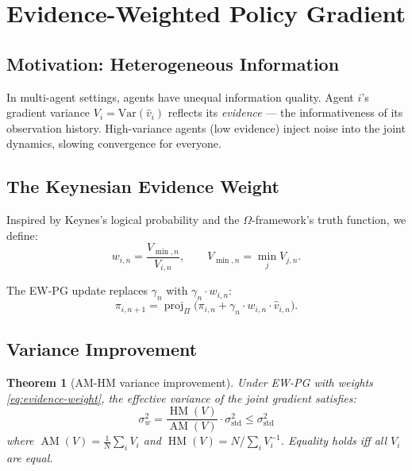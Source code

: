 \documentclass[11pt,a4paper]{article}
\newtheorem{theorem}{Theorem}[section]
\DeclareMathOperator{\proj}{proj}
\DeclareMathOperator{\AM}{AM}
\DeclareMathOperator{\HM}{HM}
\begin{document}
\section{Evidence-Weighted Policy Gradient}\label{sec:ewpg}

\subsection{Motivation: Heterogeneous Information}

In multi-agent settings, agents have unequal information quality.
Agent $i$'s gradient variance $V_i = \text{Var}(\hat{v}_i)$ reflects
its \emph{evidence} --- the informativeness of its observation history.
High-variance agents (low evidence) inject noise into the joint
dynamics, slowing convergence for everyone.

\subsection{The Keynesian Evidence Weight}

Inspired by Keynes's logical probability and the $\Omega$-framework's
truth function, we define:
\begin{equation}\label{eq:evidence-weight}
    w_{i,n} = \frac{V_{\min,n}}{V_{i,n}}, \qquad V_{\min,n} = \min_j V_{j,n}.
\end{equation}

The EW-PG update replaces $\gamma_n$ with $\gamma_n \cdot w_{i,n}$:
\begin{equation}\label{eq:ewpg-update}
    \pi_{i,n+1} = \proj_\Pi\!\bigl(\pi_{i,n} + \gamma_n \cdot w_{i,n} \cdot \hat{v}_{i,n}\bigr).
\end{equation}

\subsection{Variance Improvement}

\begin{theorem}[AM-HM variance improvement]\label{thm:variance}
Under EW-PG with weights \eqref{eq:evidence-weight}, the effective
variance of the joint gradient satisfies:
\begin{equation}
    \sigma_w^2 = \frac{\HM(V)}{\AM(V)} \cdot \sigma_{\text{std}}^2
    \leq \sigma_{\text{std}}^2
\end{equation}
where $\AM(V) = \frac{1}{N}\sum_i V_i$ and $\HM(V) = N / \sum_i V_i^{-1}$.
Equality holds iff all $V_i$ are equal.
\end{theorem}
\end{document}
